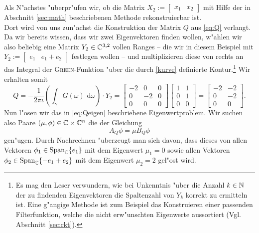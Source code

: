 Als N"achstes "uberpr"ufen wir, ob die Matrix $X_2 := \begin{bmatrix} x_1 & x_2\end{bmatrix}$ mit Hilfe der in Abschnitt \ref{sec:math} beschriebenen Methode rekonstruierbar ist.\\

Dort wird von uns zun"achst die Konstruktion der Matrix $Q$ aus \eqref{eq:Q} verlangt.
Da wir bereits wissen, dass wir zwei Eigenvektoren finden wollen, w"ahlen wir also beliebig
eine Matrix $Y_2 \in \mathbb{C}^{3,2}$ vollen Ranges -- die wir in diesem
Beispiel mit $Y_2 := \begin{bmatrix} e_1 & e_1 + e_2 \end{bmatrix}$ festlegen wollen --
und multiplizieren diese von rechts an das Integral der \textsc{Green}-Funktion "uber
die durch \eqref{kurve} definierte Kontur.\footnote{Es mag den Leser verwundern,
wie bei Unkenntnis "uber die Anzahl $k\in\mathbb{N}$ der zu findenden Eigenvektoren die
Spaltenzahl von $Y_k$ korrekt zu ermitteln ist. Eine g"angige Methode ist zum Beispiel das Konstruieren einer
passenden Filterfunktion, welche die nicht erw"unschten Eigenwerte aussortiert (Vgl. Abschnitt \ref{sec:rkt}).}
Wir erhalten somit
\[
Q = -\frac{1}{2\pi\iota}\left(\int_{\gamma}G(\omega)\text{ d}\omega \right)\cdot Y_2
= \begin{bmatrix} -2 & 0&0 \\ 0 & -2& 0\\ 0&0&0\end{bmatrix}
\begin{bmatrix} 1 & 1 \\ 0 & 1\\0&0 \end{bmatrix}
= \begin{bmatrix} -2 & -2 \\ 0 & -2\\0&0 \end{bmatrix}.
\]
Nun l"osen wir das in \eqref{eq:Qeigen} beschriebene
Eigenwertproblem. Wir suchen also Paare $(\mu,\phi) \in \mathbb{C}\times\mathbb{C}^n$ die
der Gleichung
\[
A_Q \phi = \mu B_Q \phi
\]
gen"ugen. Durch Nachrechnen "uberzeugt man sich davon, dass dieses von allen
Vektoren $\phi_1 \in \text{Span}_{\mathbb{C}}\{e_1\}$ mit dem Eigenwert $\mu_1 = 0$ sowie
allen Vektoren $\phi_2 \in \text{Span}_{\mathbb{C}}\{-e_1 + e_2\}$ mit dem Eigenwert
$\mu_2 = 2$ gel"ost wird.\\

